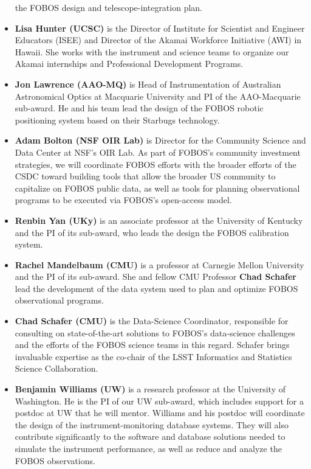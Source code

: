 \documentclass[oneside,11pt]{amsart}
\begin{document}
\begin{itemize}
the FOBOS design and telescope-integration plan.\\[-5pt]
%
\item {\bf Lisa Hunter (UCSC)} is the Director of Institute for
Scientist and Engineer Educators (ISEE) and Director of the Akamai
Workforce Initiative (AWI) in Hawaii. She works with the instrument and
science teams to organize our Akamai internships and Professional
Development Programs.\\[-5pt]
%
\item {\bf Jon Lawrence (AAO-MQ)} is Head of Instrumentation of
Australian Astronomical Optics at Macquarie University and PI of the
AAO-Macquarie sub-award.  He and his team lead the design of the FOBOS
robotic positioning system based on their Starbugs technology.\\[-5pt]
%
\item {\bf Adam Bolton (NSF OIR Lab)} is Director for the Community
Science and Data Center at NSF's OIR Lab.  As part of FOBOS's community
investment strategies, we will coordinate FOBOS efforts with the broader
efforts of the CSDC toward building tools that allow the broader US
community to capitalize on FOBOS public data, as well as tools for
planning observational programs to be executed via FOBOS's open-access
model.\\[-5pt]
%
\item {\bf Renbin Yan (UKy)} is an associate professor at the University
of Kentucky and the PI of its sub-award, who leads the design the FOBOS
calibration system.\\[-5pt]
%
\item {\bf Rachel Mandelbaum (CMU)} is a professor at Carnegie Mellon
University and the PI of its sub-award. She and fellow CMU Professor
{\bf Chad Schafer} lead the development of the data system used to plan
and optimize FOBOS observational programs.\\[-5pt]
%
\item {\bf Chad Schafer (CMU)} is the Data-Science Coordinator,
responsible for consulting on state-of-the-art solutions to FOBOS’s
data-science challenges and the efforts of the FOBOS science teams in
this regard. Schafer brings invaluable expertise as the co-chair of the
LSST Informatics and Statistics Science Collaboration.\\[-5pt]
%
\item {\bf Benjamin Williams (UW)} is a research professor at the
University of Washington.  He is the PI of our UW sub-award, which
includes support for a postdoc at UW that he will mentor. Williams and
his postdoc will coordinate the design of the instrument-monitoring
database systems.  They will also contribute significantly to the
software and database solutions needed to simulate the instrument
performance, as well as reduce and analyze the FOBOS observations. 
%
\end{itemize}
\end{document}
